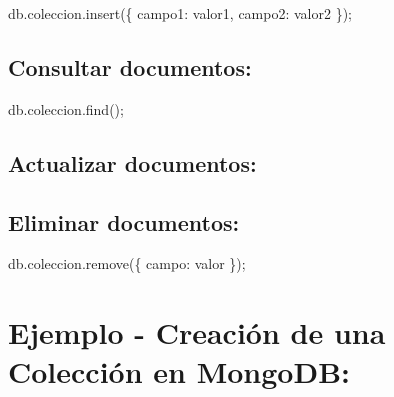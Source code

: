 \documentclass[
  a4paper,
  onepage,
  openany]{scrreprt}
\newenvironment{Shaded}{\begin{snugshade}}{\end{snugshade}}
\newcommand{\NormalTok}[1]{\textcolor[rgb]{0.00,0.23,0.31}{#1}}
\begin{document}
\begin{Shaded}
\begin{Highlighting}[]
\NormalTok{db.coleccion.insert(\{ campo1: valor1, campo2: valor2 \});}
\end{Highlighting}
\end{Shaded}

\hypertarget{consultar-documentos}{%
\subsection{Consultar documentos:}\label{consultar-documentos}}

\begin{Shaded}
\begin{Highlighting}[]
\NormalTok{db.coleccion.find();}
\end{Highlighting}
\end{Shaded}

\hypertarget{actualizar-documentos}{%
\subsection{Actualizar documentos:}\label{actualizar-documentos}}

\begin{Shaded}
\end{Shaded}

\hypertarget{eliminar-documentos}{%
\subsection{Eliminar documentos:}\label{eliminar-documentos}}

\begin{Shaded}
\begin{Highlighting}[]
\NormalTok{db.coleccion.remove(\{ campo: valor \});}
\end{Highlighting}
\end{Shaded}

\hypertarget{ejemplo---creaciuxf3n-de-una-colecciuxf3n-en-mongodb}{%
\section{Ejemplo - Creación de una Colección en
MongoDB:}\label{ejemplo---creaciuxf3n-de-una-colecciuxf3n-en-mongodb}}
\end{document}
